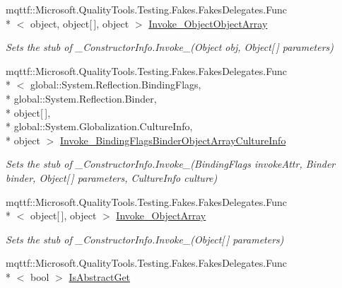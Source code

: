 \begin{DoxyCompactItemize}
mqttf\-::\-Microsoft.\-Quality\-Tools.\-Testing.\-Fakes.\-Fakes\-Delegates.\-Func\\*
$<$ object, object\mbox{[}$\,$\mbox{]}, object $>$ \hyperlink{class_system_1_1_runtime_1_1_interop_services_1_1_fakes_1_1_stub___constructor_info_ac544eee85a761dd5d1a14f10b55426eb}{Invoke\-\_\-Object\-Object\-Array}
\begin{DoxyCompactList}\small\item\em Sets the stub of \-\_\-\-Constructor\-Info.\-Invoke\-\_(\-Object obj, Object\mbox{[}$\,$\mbox{]} parameters)\end{DoxyCompactList}\item 
mqttf\-::\-Microsoft.\-Quality\-Tools.\-Testing.\-Fakes.\-Fakes\-Delegates.\-Func\\*
$<$ global\-::\-System.\-Reflection.\-Binding\-Flags, \\*
global\-::\-System.\-Reflection.\-Binder, \\*
object\mbox{[}$\,$\mbox{]}, \\*
global\-::\-System.\-Globalization.\-Culture\-Info, \\*
object $>$ \hyperlink{class_system_1_1_runtime_1_1_interop_services_1_1_fakes_1_1_stub___constructor_info_abcdf89e2404c09c59ef1f993732856cf}{Invoke\-\_\-Binding\-Flags\-Binder\-Object\-Array\-Culture\-Info}
\begin{DoxyCompactList}\small\item\em Sets the stub of \-\_\-\-Constructor\-Info.\-Invoke\-\_(\-Binding\-Flags invoke\-Attr, Binder binder, Object\mbox{[}$\,$\mbox{]} parameters, Culture\-Info culture)\end{DoxyCompactList}\item 
mqttf\-::\-Microsoft.\-Quality\-Tools.\-Testing.\-Fakes.\-Fakes\-Delegates.\-Func\\*
$<$ object\mbox{[}$\,$\mbox{]}, object $>$ \hyperlink{class_system_1_1_runtime_1_1_interop_services_1_1_fakes_1_1_stub___constructor_info_a2bd0c7b27cfdc35dc59cfc9face996d9}{Invoke\-\_\-Object\-Array}
\begin{DoxyCompactList}\small\item\em Sets the stub of \-\_\-\-Constructor\-Info.\-Invoke\-\_(\-Object\mbox{[}$\,$\mbox{]} parameters)\end{DoxyCompactList}\item 
mqttf\-::\-Microsoft.\-Quality\-Tools.\-Testing.\-Fakes.\-Fakes\-Delegates.\-Func\\*
$<$ bool $>$ \hyperlink{class_system_1_1_runtime_1_1_interop_services_1_1_fakes_1_1_stub___constructor_info_a346e440f62fee5af08cc7bbfe949dba3}{Is\-Abstract\-Get}

\end{DoxyCompactItemize}
